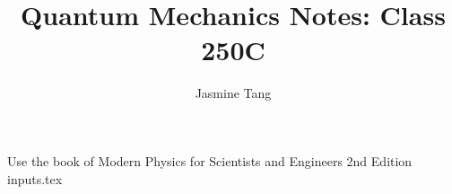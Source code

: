 \documentclass{article}
\title{Quantum Mechanics Notes: Class 250C}
\author{Jasmine Tang }
\begin{document}
\maketitle

\tableofcontents
Use the book of Modern Physics for Scientists and Engineers 2nd Edition
{inputs.tex}
\end{document}
